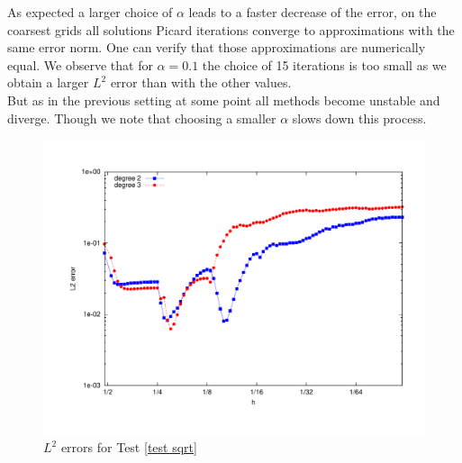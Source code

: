 As expected a larger choice of $\alpha$ leads to a faster decrease of the error, on the coarsest grids all solutions Picard iterations converge to approximations with the same error norm. One can verify that those approximations are numerically equal. We observe that for $\alpha=0.1$ the choice of 15 iterations is too small as we obtain a larger $L^2$ error than with the other values.\\
But as in the previous setting at some point all methods become unstable and diverge. Though we note that choosing a smaller $\alpha$ slows down this process. 

  \begin{figure}[H]
  	\centering
  	\includegraphics[scale =0.37]{plots/MA3.pdf}
  	\caption{$L^2$ errors for Test \ref{test sqrt}}
  	\label{fig: l2 errors test sqrt ourMethod}
  \end{figure}
  
